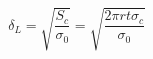 \begin{equation}
     \delta_L = \sqrt{\frac{S_c}{\sigma_0}} = \sqrt{\frac{2\pi r t \sigma_c}{\sigma_0}}
\label{eq:conduction_length}
\end{equation}
